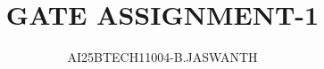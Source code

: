 \documentclass[journal]{IEEEtran}
\begin{document}

\vspace{3cm}


\renewcommand{\thetable}{\theenumi}




\vspace{3cm}


\title{GATE ASSIGNMENT-1}
\author{AI25BTECH11004-B.JASWANTH}
{\let\newpage\relax\maketitle}


\renewcommand{\thefigure}{\theenumi}
\renewcommand{\thetable}{\theenumi}
\setlength{\intextsep}{10pt} %
\end{document}
